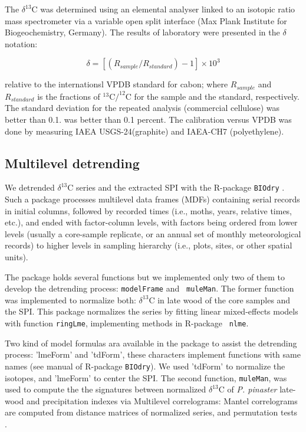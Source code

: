 \documentclass[review,authoryear]{elsarticle}
\begin{document}
The $\delta^{13}$C was determined using an elemental analyser linked
to an isotopic ratio mass spectrometer via a variable open split
interface (Max Plank Institute for Biogeochemistry, Germany). The
results of laboratory were presented in the $\delta$ notation:

\begin{equation}\label{eq:dC}
\delta = \left [ \left ( R_{sample}/R_{standard} \right )-1 \right ]\times 10^3 
\end{equation}


relative to the internationsl VPDB standard for cabon; where
$R_{sample}$ and $R_{standard}$ is the fractions of $^{13}$C$/^{12}$C
for the sample and the standard, respectively. The standard deviation
for the repeated analysis (commercial cellulose) was better than
0.1. was better than 0.1 percent. The calibration versus VPDB was done
by measuring IAEA USGS-24(graphite) and IAEA-CH7 (polyethylene).

\subsection{Multilevel detrending}
We detrended $\delta^{13}$C series and the extracted SPI with
the R-package {\tt BIOdry} \citep{Lara2015b,Lara2013}. Such a package
processes multilevel data frames (MDFs) containing serial records in
initial columns, followed by recorded times (i.e., moths, years,
relative times, etc.), and ended with factor-column levels, with
factors being ordered from lower levels (usually a core-sample
replicate, or an annual set of monthly meteorological records) to
higher levels in sampling hierarchy (i.e., plots, sites, or other
spatial units). 

The package holds several functions but we implemented only two of
them to develop the detrending process: {\tt modelFrame} and {\tt
  muleMan}. The former function was implemented to normalize both:
$\delta^{13}$C in late wood of the core samples and the SPI. This
package normalizes the series by fitting linear mixed-effects models
with function {\tt ringLme}, implementing methods in R-package {\tt
  nlme}.

Two kind of model formulas ara available in the package to assist the
detrending process: 'lmeForm' and 'tdForm', these characters implement
functions with same names (see manual of R-package {\tt BIOdry}). We
used 'tdForm' to normalize the isotopes, and 'lmeForm' to center the
SPI. The second function, {\tt muleMan}, was used to compute the the
signatures between normalized $\delta^{13}$C of \textit{P. pinaster}
late-wood and precipitation indexes via Multilevel correlograms:
Mantel correlograms are computed from distance matrices of normalized
series, and permutation tests \citep{Goslee2007}.
\end{document}

